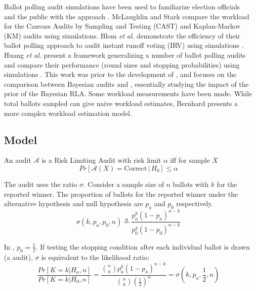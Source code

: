 Ballot polling audit simulations have been used to familiarize election officials and the public with the approach \cite{dice}. McLaughlin and Stark \cite{mclaughlin_thesis,simulations_house} compare the workload for the Canvass Audits by Sampling and Testing (CAST) and Kaplan-Markov (KM) audits using simulations. Blom {\em et al.} demonstrate the efficiency of their ballot polling approach to audit instant runoff voting (IRV) using simulations \cite{blom_IRV}. Huang {\em et al.} present a framework generalizing a number of ballot polling audits and compare their performance (round sizes and stopping probabilities) using simulations \cite{DBLP:conf/evoteid/HuangRSTV20}. This work was prior to the development of \Minerva, and focuses on the comparison between Bayesian audits \cite{bayesian-audits} and \BRAVO, essentially studying the impact of the prior of the Bayesian RLA. Some workload measurements have been made\cite{RI-report}. While total ballots sampled can give naive workload estimates\cite{bernoulli-ballot-polling}, Bernhard presents a more complex workload estimation model\cite{bernhard-diss}. 

\subsection{Model}

\begin{definition}
An audit $\mathcal{A}$ is a Risk Limiting Audit with 
risk limit $\alpha$ iff for sample $X$
$$
Pr[\mathcal{A}(X) 
= \text{Correct} \,|\, H_0]\le \alpha
$$
\end{definition}

\begin{definition} \label{def:bravo-ratio} The \BRAVO audit uses the ratio $\sigma$. Consider a sample size of $n$ ballots with $k$ for the reported winner. The proportion of ballots for the reported winner under the alternative hypothesis and null hypothesis are $p_a$ and $p_0$ respectively.
\begin{equation}
    \sigma(k, p_a, p_0, n) \triangleq \frac{p_a^{k} (1-p_a)^{n-k}}{p_0^{k} (1-p_0)^{n-k}} 
    \label{eqn:bravoratio}
\end{equation}
\end{definition}

In \BRAVO, $p_0=\frac{1}{2}$. If testing the \BRAVO stopping condition after each individual ballot
is drawn (a \B \BRAVO audit), $\sigma$ is equivalent to the 
likelihood ratio:
$$
\frac{Pr[K=k|H_a,n]}{Pr[K=k|H_0,n]}= \frac{\binom{n}{k}p_a^{k} (1-p_a)^{n-k}}{\binom{n}{k}(\frac{1}{2})^n} =\sigma(k, p_a, \frac{1}{2}, n)
$$

